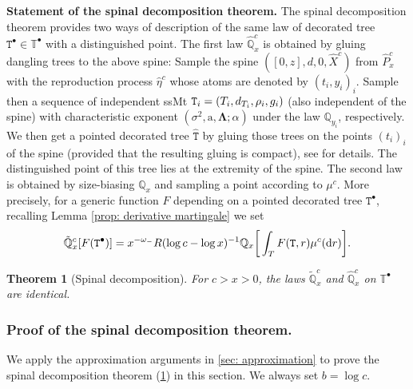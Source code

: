 \documentclass[12pt]{article}
\numberwithin{equation}{section}
\theoremstyle{plain}
\newtheorem{thm}{Theorem}[section]
\theoremstyle{definition}
\begin{document}
\bigskip

\noindent \textbf{Statement of the spinal decomposition theorem.}
The spinal decomposition theorem provides two ways of description of the same law of decorated tree $\mathtt{T}^\bullet \in \mathbb{T}^\bullet$ with a distinguished point. The first law $\hat{\mathbb{Q}}^c_x$ is obtained by gluing dangling trees to the above spine: Sample the spine $([0, z], d, 0, \hat{X}^c)$ from $\hat{P}^c_x$ with the reproduction process $\hat{\eta}^c$ whose atoms are denoted  by $(t_i, y_i)_i$. Sample then a sequence of independent ssMt ${\tt T}_i = (T_i, d_{T_i}, \rho_i, g_i)$ (also independent of the spine) with characteristic exponent $(\sigma^2, \mathrm{a}, \boldsymbol{\Lambda}; \alpha)$ under the law $\mathbb{Q}_{y_i}$,  respectively. We then get a pointed decorated tree $\hat{\mathtt{T}}$ by gluing those trees on the points $(t_i)_i$ of the spine (provided that the resulting gluing is compact), see \cite{BertoinJean2024SMta} for details. The distinguished point of this tree lies at the extremity of the spine. The second law is obtained by size-biasing $\mathbb{Q}_x$ and sampling a point according to $\mu^c$. More precisely, for a generic function $F$ depending on a pointed decorated tree $\mathtt{T}^\bullet$, recalling Lemma \ref{prop: derivative martingale} we set
\[\tilde{\mathbb{Q}}^{c}_{x}[F({\tt T}^{\bullet})] = x^{-\omega_-}R(\log c-\log x)^{-1}\mathbb{Q}_{x}\bigg[\int_{T}F({\tt T}, r)\mu^c(\mathrm{d}r)\bigg].\]


\begin{thm}[Spinal decomposition]\label{thm: spinal decomposition truncated}
For $c>x>0$, the laws $\tilde{\mathbb{Q}}^c_x$ and $\hat{\mathbb{Q}}^c_x$ on $\mathbb{T}^\bullet$ are identical.
\end{thm}


\subsubsection{Proof of the spinal decomposition theorem.} \label{sec: proof spinal decomposition}
We apply the approximation arguments in \cref{sec: approximation} to prove the spinal decomposition theorem (\cref{thm: spinal decomposition truncated}) in this section. We always set $b=\log c$.
\end{document}

